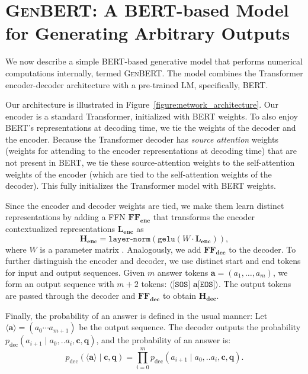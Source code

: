 \documentclass[11pt,a4paper]{article}
\newcommand\bert{\textsc{BERT}}
\newcommand\genbert{\textsc{GenBERT}}
\newcommand\question{\mathbf{q}}
\newcommand\context{\mathbf{c   }}
\newcommand\answer{\mathbf{a}}
\begin{document}
 \section{\genbert{}: A \bert{}-based Model for Generating Arbitrary Outputs}
\label{sec:genbert}







We now describe a simple \bert{}-based generative model that performs numerical computations internally, termed \genbert{}. The model combines the Transformer
encoder-decoder architecture \cite{vaswani2017attention} with a
pre-trained LM, specifically, \bert{}.

Our architecture is illustrated in Figure~\ref{figure:network_architecture}. 
Our encoder is a standard Transformer, initialized with \bert{} weights.
To also enjoy \bert{}'s representations at decoding time, 
we tie the weights of the decoder and the encoder. Because the Transformer decoder has
\emph{source attention} weights (weights for attending to the encoder
representations at decoding time) that are not present in \bert{}, we tie these
source-attention weights to the self-attention weights of the encoder (which are
tied to the self-attention weights of the decoder). This fully initializes the
Transformer model with \bert{} weights.


Since the encoder and decoder weights are tied, we make them learn
distinct representations by adding a FFN
$\mathbf{FF_{enc}}$ that transforms the encoder
contextualized representations $\mathbf{L_{enc}}$ as 
\[
\mathbf{H_{enc}} = \texttt{layer-norm}(\texttt{gelu}(W\cdot\mathbf{L_{enc}})),
\]
where $W$ is a parameter matrix \cite{hendrycks2016gelu, ba2016layer}.
Analogously, we add $\mathbf{FF_{dec}}$ to the decoder. To further distinguish
the encoder and decoder, we use distinct start and end tokens for input and
output sequences. Given $m$ answer tokens $\answer = (a_1, \dots, a_m)$, we form
an output sequence with $m+2$ tokens: $\langle \texttt{[SOS] }\answer\texttt{
  [EOS]} \rangle$. The output tokens
are passed through the decoder and $\mathbf{FF_{dec}}$ to obtain $\mathbf{H_{dec}}$.

Finally, the probability of an answer is defined in the usual manner:
Let $\langle\answer\rangle = (a_0 \cdots a_{m+1})$ be the output
sequence. The decoder outputs the probability $p_\text{dec}(a_{i+1} \mid
a_0,..a_i,\context,\question)$, and the probability of an answer is: 
\[
p_{\text{dec}}(\langle\answer\rangle \mid \context,\question) = \prod_{i=0}^{m}
p_\text{dec}(a_{i+1} \mid a_0,..a_{i},\context,\question).
\]
\end{document}
